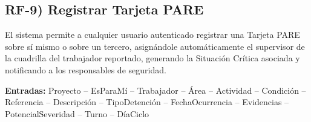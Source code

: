 
\subsection*{RF-9) Registrar Tarjeta PARE}
El sistema permite a cualquier usuario autenticado registrar una Tarjeta PARE sobre s\'i mismo o sobre un tercero, asign\'andole autom\'aticamente el supervisor de la cuadrilla del trabajador reportado, generando la Situaci\'on Cr\'itica asociada y notificando a los responsables de seguridad.

\textbf{Entradas:} Proyecto -- EsParaM\'i -- Trabajador -- \'Area -- Actividad -- Condici\'on -- Referencia -- Descripci\'on -- TipoDetenci\'on -- FechaOcurrencia -- Evidencias -- PotencialSeveridad -- Turno -- D\'iaCiclo

